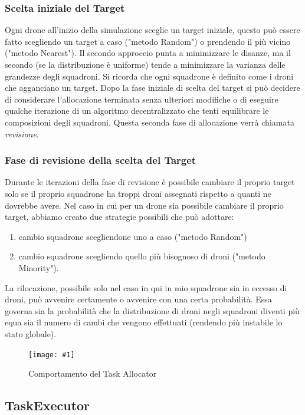 \documentclass[a4paper,11pt,oneside, table]{article}
\newcommand{\putimage}[4] {
	\begin{figure}[H]
	    \centering
	    \texttt{[image: \#1]}
	    \caption{#2}\label{#3}
	\end{figure}
}
\begin{document}
\subsubsection{Scelta iniziale del Target}

Ogni drone all'inizio della simulazione sceglie un target iniziale, questo pu\`o essere fatto scegliendo un target a caso ("metodo Random") o prendendo il pi\`u vicino ("metodo Nearest").
Il secondo approccio punta a minimizzare le disanze, ma il secondo (se la distribuzione \`e uniforme) tende a minimizzare la varianza delle grandezze degli squadroni.
Si ricorda che ogni squadrone \`e definito come i droni che agganciano un target.
Dopo la fase iniziale di scelta del target si pu\`o decidere di considerare l'allocazione terminata senza ulteriori modifiche o di eseguire qualche iterazione di un algoritmo decentralizzato che tenti equilibrare le composizioni degli squadroni.
Questa seconda fase di allocazione verr\`a chiamata \textit{revisione}.

\subsubsection{Fase di revisione della scelta del Target}

Durante le iterazioni della fase di revisione \`e possibile cambiare il proprio target solo se il proprio squadrone ha troppi droni assegnati rispetto a quanti ne dovrebbe avere.
Nel caso in cui per un drone sia possibile cambiare il proprio target, abbiamo creato due strategie possibili che pu\`o adottare:
\begin{enumerate}
    \item cambio squadrone scegliendone uno a caso ("metodo Random")
    \item cambio squadrone scegliendo quello pi\`u bisognoso di droni ("metodo Minority").
\end{enumerate}

La rilocazione, possibile solo nel caso in qui in mio squadrone sia in eccesso di droni, pu\`o avvenire certamente o avvenire con una certa probabilit\`a. Essa governa sia la probabilit\`a che la distribuzione di droni negli squadroni diventi pi\`u equa sia il numero di cambi che vengono effettuati (rendendo pi\`u instabile lo stato globale).

\putimage{images/task-allocator.png}{Comportamento del Task Allocator}{png:task-allocator}{0.99}

\subsection{TaskExecutor}
\end{document}
